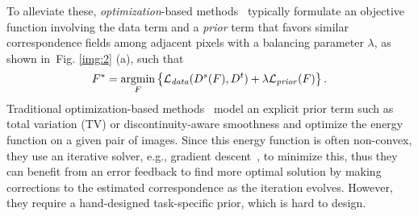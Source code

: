 \documentclass[10pt,twocolumn,letterpaper]{article}
\newcommand{\figref}[1]{Fig. \ref{#1}}
\begin{document}
To alleviate these, \emph{optimization}-based methods~\cite{anguelov2005scape,liu2010sift,bleyer2011patchmatch,taniai2016joint,liao2017visual,kim2017dctm} typically formulate an objective function involving the data term and a \emph{prior} term that favors similar correspondence fields among adjacent pixels with a balancing parameter $\lambda$, as shown in~\figref{img:2} (a), such that
\begin{equation}
F^{*} = \underset{F}{\mathrm{argmin}}  
\left\{ \mathcal{L}_{\it{data}}(D^{s}(F),D^{t})
+\lambda \mathcal{L}_{\it{prior}}(F) \right\}.
\end{equation}
Traditional optimization-based methods~\cite{liu2010sift,taniai2016joint,ham2016proposal,liu2010sift,ham2016proposal,kim2017dctm} model an explicit prior term such as total variation (TV) or discontinuity-aware smoothness and optimize the energy function on a given pair of images. Since this energy function is often non-convex, they use an iterative solver, e.g., gradient descent~\cite{kingma2014adam}, to minimize this, thus they can benefit from an error feedback to find more optimal solution by making corrections to the estimated correspondence as the iteration evolves. However, they require a hand-designed task-specific prior, which is hard to design.
\end{document}
